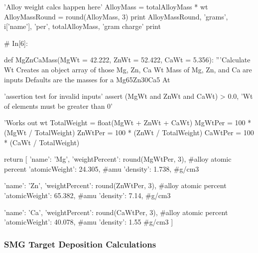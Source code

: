 \documentclass[a4paper,8pt]{article}
\begin{document}
\begin{python}
'Alloy weight calcs happen here'
AlloyMass = totalAlloyMass * wt
AlloyMassRound = round(AlloyMass, 3) 
print AlloyMassRound, 'grams', i['name'], 'per', totalAlloyMass, 'gram charge'
print 


# In[6]:

def MgZnCaMass(MgWt = 42.222, ZnWt = 52.422, CaWt = 5.356):
'''Calculate Wt%
Creates an object array of those Mg, Zn, Ca Wt%
Mass of Mg, Zn, and Ca are inputs
Defaults are the masses for a Mg65Zn30Ca5 At%

'assertion test for invalid inputs'
assert (MgWt and ZnWt and CaWt) > 0.0, 'Wt of elements must be greater than 0'

'Works out wt%
TotalWeight = float(MgWt + ZnWt + CaWt)
MgWtPer = 100 * (MgWt / TotalWeight)
ZnWtPer = 100 * (ZnWt / TotalWeight)
CaWtPer = 100 * (CaWt / TotalWeight)

return [
{'name': 'Mg', 
	'weightPercent': round(MgWtPer, 3), #alloy atomic percent
	'atomicWeight': 24.305, #amu
	'density': 1.738}, #g/cm3

{'name': 'Zn', 
	'weightPercent': round(ZnWtPer, 3), #alloy atomic percent
	'atomicWeight': 65.382, #amu
	'density': 7.14}, #g/cm3

{'name': 'Ca', 
	'weightPercent': round(CaWtPer, 3), #alloy atomic percent
	'atomicWeight': 40.078, #amu
	'density': 1.55} #g/cm3
]
\end{python}

\newpage
\subsubsection{SMG Target Deposition Calculations}
\end{document}
